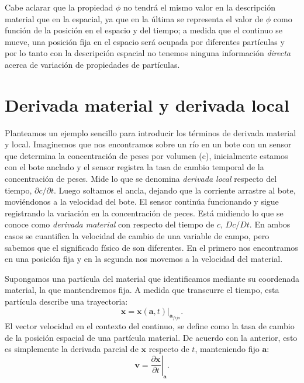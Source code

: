 \documentclass[a4paper,10pt, oneside]{book}
\begin{document}
Cabe aclarar que la propiedad $\phi$ no tendrá el mismo valor en la descripción material que en la espacial, ya que en la última se representa el valor de $\phi$ como función de la posición en el espacio y del tiempo; a medida que el continuo se mueve, una posición fija en el espacio será ocupada por diferentes partículas y por lo tanto con la descripción espacial no tenemos ninguna información \textit{directa} acerca de variación de propiedades de partículas. 

\section{Derivada material y derivada local}

Planteamos un ejemplo sencillo para introducir los términos de derivada material y local. Imaginemos que nos encontramos sobre un río en un bote con un sensor que determina la concentración de peses por volumen (c), inicialmente estamos con el bote anclado y el sensor registra la tasa de cambio temporal de la concentración de peses. Mide lo que se denomina \textit{derivada local} respecto del tiempo, $\partial c / \partial t$. Luego soltamos el ancla, dejando que la corriente arrastre al bote, moviéndonos a la velocidad del bote. El sensor continúa funcionando y sigue registrando la variación en la concentración de peces. Está midiendo lo que se conoce como \textit{derivada material} con respecto del tiempo de $c$, $Dc/Dt$. En ambos casos se cuantifica la velocidad de cambio de una variable de campo, pero sabemos que el significado físico de son diferentes. En el primero nos encontramos en una posición fija y en la segunda nos movemos a la velocidad del material.

Supongamos una partícula del material que identificamos mediante su coordenada material, la que mantendremos fija. A medida que transcurre el tiempo, esta partícula describe una trayectoria:
\begin{equation}
	\mathbf{x} = \left. \mathbf{x}(\mathbf{a},t) \right\vert_{\mathbf{a}_{fija}}. \nonumber
\end{equation}
El vector velocidad en el contexto del continuo, se define como la tasa de cambio de la posición espacial de una partícula material. De acuerdo con la anterior, esto es simplemente la derivada parcial de $\mathbf{x}$ respecto de $t$, manteniendo fijo $\mathbf{a}$:
\begin{equation}
	\mathbf{v} = \left. \frac{\partial \mathbf{x}}{\partial t} \right\vert_\mathbf{a}. \nonumber
\end{equation}
\end{document}

